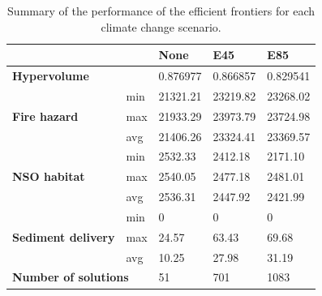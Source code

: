 \begin{table}[]
\centering
\caption[Summary of efficient frontiers]{Summary of the performance of the efficient frontiers for each climate change scenario.}
\label{tab:frontiersSummary}
\begin{tabular}{lllll}
\multicolumn{2}{l|}{}                                                  & \textbf{None} & \textbf{E45} & \textbf{E85} \\ \hline
\multicolumn{2}{l|}{\textbf{Hypervolume}}                              & 0.876977      & 0.866857     & 0.829541     \\ \hline
\multirow{3}{*}{\textbf{Fire hazard}}       & \multicolumn{1}{l|}{min} & 21321.21      & 23219.82     & 23268.02     \\
                                            & \multicolumn{1}{l|}{max} & 21933.29      & 23973.79     & 23724.98     \\
                                            & \multicolumn{1}{l|}{avg} & 21406.26      & 23324.41     & 23369.57     \\ \hline
\multirow{3}{*}{\textbf{NSO habitat}}       & \multicolumn{1}{l|}{min} & 2532.33       & 2412.18      & 2171.10      \\
                                            & \multicolumn{1}{l|}{max} & 2540.05       & 2477.18      & 2481.01      \\
                                            & \multicolumn{1}{l|}{avg} & 2536.31       & 2447.92      & 2421.99      \\ \hline
\multirow{3}{*}{\textbf{Sediment delivery}} & \multicolumn{1}{l|}{min} & 0             & 0            & 0            \\
                                            & \multicolumn{1}{l|}{max} & 24.57         & 63.43        & 69.68        \\
                                            & \multicolumn{1}{l|}{avg} & 10.25         & 27.98        & 31.19        \\ \hline
\multicolumn{2}{l}{\textbf{Number of solutions}}                       & 51            & 701          & 1083        
\end{tabular}
\end{table}


